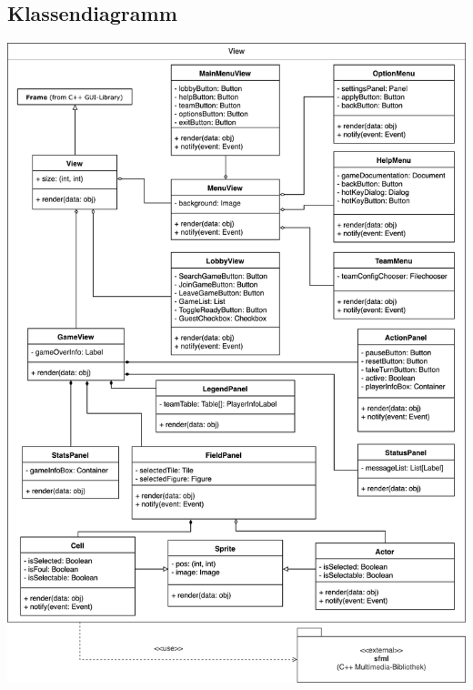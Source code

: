 \subsection{Klassendiagramm}
\begin{center}
	\includegraphics[width=13.5cm]{images/klassendiagramm_view_extended}
\end{center}

